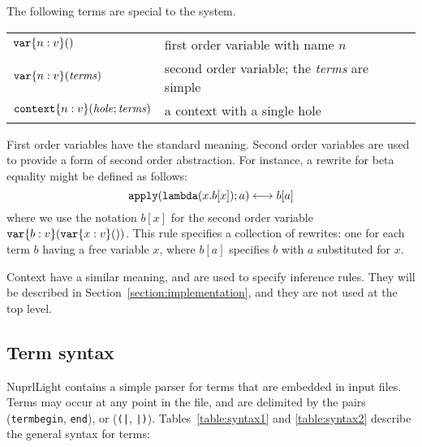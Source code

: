 \documentclass{article}
\newcommand\NuprlLight{NuprlLight}
\newcommand\metaleftrightarrow{\longleftrightarrow}
\begin{document}
The following terms are special to the system.
\begin{center}
  \begin{tabular}{ll}
    ${\tt var}\{n:v\}()$ & first order variable with name $n$\\
    ${\tt var}\{n:v\}({\it terms})$ & second order variable; the {\it terms} are simple\\
    ${\tt context}\{n:v\}({\it hole}; {\it terms})$ & a context with a single hole\\
  \end{tabular}
\end{center}
First order variables have the standard meaning.  Second order variables are used to provide
a form of second order abstraction.  For instance, a rewrite for beta equality might be defined as
follows:
$${\tt apply}({\tt lambda}(x. b[x]); a) \metaleftrightarrow b[a]$$
where we use the notation $b[x]$ for the second order variable ${\tt var}\{b:v\}({\tt
  var}\{x:v\}())$.  This rule specifies a collection of rewrites: one for each term $b$ having a free
variable $x$, where $b[a]$ specifies $b$ with $a$ substituted for $x$.

Context have a similar meaning, and are used to specify inference rules.  They will be described in
Section~\ref{section:implementation}, and they are not used at the top level.

\subsection{Term syntax}

\NuprlLight{} contains a simple parser for terms that are embedded in input files.  Terms may occur
at any point in the file, and are delimited by the pairs ({\tt termbegin}, {\tt end}), or ({\tt (|},
{\tt |)}).  Tables~\ref{table:syntax1} and \ref{table:syntax2} describe the general syntax for terms:
\end{document}
